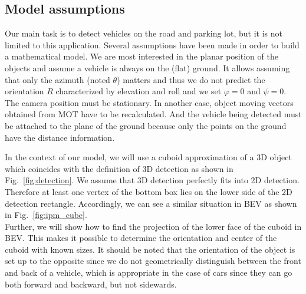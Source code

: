 \documentclass[graybox]{svmult}
\begin{document}
\subsection{Model assumptions}
Our main task is to detect vehicles on the road and parking lot, but it is not limited to this application.
Several assumptions have been made in order to build a mathematical model. 
We are most interested in the planar position of the objects and  assume a
vehicle is always on the (flat) ground. %
It allows assuming that only the azimuth (noted $\theta$) matters and thus we do not predict the orientation $R$ characterized by  elevation and roll and we set $\varphi = 0$ and $\psi = 0$.\\

The camera position must be stationary. In another case, object moving vectors obtained from MOT have to be recalculated.
And the vehicle being detected must be attached to the plane of the ground because only the points on the ground have the distance information.  




In the context of our model, we will use a cuboid approximation of a 3D object which coincides with the definition of 3D detection as shown in Fig.~\ref{fig:detection}.
We assume that 3D detection perfectly fits into 2D detection. Therefore at least one vertex of the bottom box  lies on the lower side of the 2D detection rectangle. Accordingly, we can see a similar situation in BEV as shown in Fig.~\ref{fig:ipm_cube}.\\






Further, we will show how to find the projection of the lower face of the cuboid in  BEV.
This makes it possible to determine the orientation and center of the cuboid with known sizes. It should be noted that the orientation of the object is set up to the opposite since we do not geometrically distinguish between the front and back of a vehicle, which is appropriate in the case of cars since they can go both forward and backward, but not sidewards.
\end{document}
